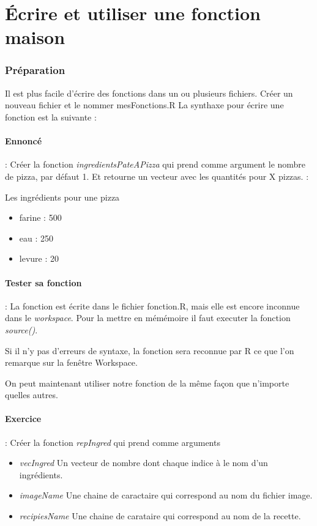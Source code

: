 \section{Écrire et utiliser une fonction maison}
\subsubsection{Préparation}
Il est plus facile d'écrire des fonctions dans un ou plusieurs fichiers. Créer un nouveau fichier et le nommer mesFonctions.R
La synthaxe pour écrire une fonction est la suivante : 

\paragraph{Ennoncé} : Créer la fonction \emph{ingredientsPateAPizza} qui prend comme argument le nombre de pizza, par défaut 1. Et retourne un vecteur avec les quantités pour X pizzas. : 

Les ingrédients pour une pizza
\begin{itemize}
	\item farine : 500
	\item eau : 250
	\item levure : 20
\end{itemize}


\paragraph{Tester sa fonction} : La fonction est écrite dans le fichier fonction.R, mais elle est encore inconnue dans le \emph{workspace}. Pour la mettre en mémémoire il faut executer la fonction  \emph{source()}.

Si il n'y pas d'erreurs de syntaxe, la fonction sera reconnue par R ce que l'on remarque sur la fenêtre Workspace.
\par
On peut maintenant utiliser notre fonction de la même façon que n'importe quelles autres.

\paragraph{Exercice} : Créer la fonction \emph{repIngred} qui prend comme arguments 
\begin{itemize}
\item \emph{vecIngred} Un vecteur de nombre dont chaque indice à le nom d'un ingrédients.
\item \emph{imageName} Une chaine de caractaire qui correspond au nom du fichier image.
\item \emph{recipiesName} Une chaine de carataire qui correspond au nom de la recette. 
\end{itemize}


